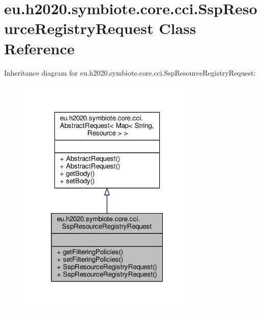 \hypertarget{classeu_1_1h2020_1_1symbiote_1_1core_1_1cci_1_1SspResourceRegistryRequest}{}\section{eu.\+h2020.\+symbiote.\+core.\+cci.\+Ssp\+Resource\+Registry\+Request Class Reference}
\label{classeu_1_1h2020_1_1symbiote_1_1core_1_1cci_1_1SspResourceRegistryRequest}


Inheritance diagram for eu.\+h2020.\+symbiote.\+core.\+cci.\+Ssp\+Resource\+Registry\+Request\+:
\nopagebreak
\begin{figure}[H]
\begin{center}
\leavevmode
\includegraphics[width=244pt]{classeu_1_1h2020_1_1symbiote_1_1core_1_1cci_1_1SspResourceRegistryRequest__inherit__graph}
\end{center}
\end{figure}



